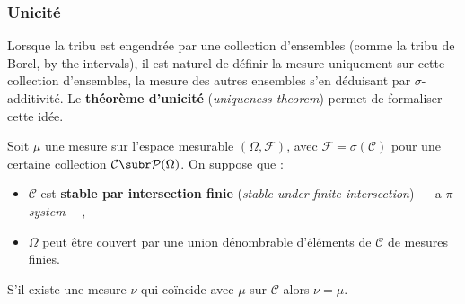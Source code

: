\subsubsection{Unicité}

Lorsque la tribu est engendrée par une collection d'ensembles (comme la tribu de
Borel, by the intervals), il est naturel de définir la mesure uniquement sur cette
collection d'ensembles, la mesure des autres ensembles s'en déduisant par
$\sigma$-additivité. Le \textbf{théorème d'unicité} (\textit{uniqueness theorem})
permet de formaliser cette idée.

\begin{theorem}[Unicité]
  Soit $\mu$ une mesure sur l'espace mesurable $(\Omega,\mathcal{F})$, avec
  $\mathcal{F} = \sigma(\mathcal{C})$ pour une certaine collection $\mathcal{C} \subr
  \mathcal{P}(\Omega)$. On suppose que :
  \begin{itemize}
    \item $\mathcal{C}$ est \textbf{stable par intersection finie}
      (\textit{stable under finite intersection}) --- a \emph{$\pi$-system} ---,
    \item $\Omega$ peut être couvert par une union dénombrable d'éléments de
      $\mathcal{C}$ de mesures finies.
  \end{itemize}
  S'il existe une mesure $\nu$ qui coïncide avec $\mu$ sur $\mathcal{C}$ alors $\nu
  = \mu$.
\end{theorem}

